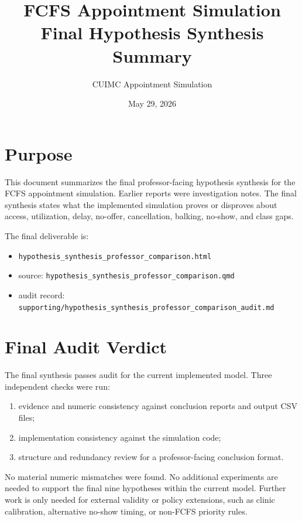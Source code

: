\documentclass[11pt]{article}
\title{FCFS Appointment Simulation\\Final Hypothesis Synthesis Summary}
\author{CUIMC Appointment Simulation}
\date{May 29, 2026}
\begin{document}
\maketitle

\section*{Purpose}

This document summarizes the final professor-facing hypothesis synthesis for
the FCFS appointment simulation. Earlier reports were investigation notes. The
final synthesis states what the implemented simulation proves or disproves about
access, utilization, delay, no-offer, cancellation, balking, no-show, and class
gaps.

The final deliverable is:

\begin{itemize}
  \item \texttt{hypothesis\_synthesis\_professor\_comparison.html}
  \item source: \texttt{hypothesis\_synthesis\_professor\_comparison.qmd}
  \item audit record: \texttt{supporting/hypothesis\_synthesis\_professor\_comparison\_audit.md}
\end{itemize}

\section*{Final Audit Verdict}

The final synthesis passes audit for the current implemented model. Three
independent checks were run:

\begin{enumerate}
  \item evidence and numeric consistency against conclusion reports and output
        CSV files;
  \item implementation consistency against the simulation code;
  \item structure and redundancy review for a professor-facing conclusion
        format.
\end{enumerate}

No material numeric mismatches were found. No additional experiments are needed
to support the final nine hypotheses within the current model. Further work is
only needed for external validity or policy extensions, such as clinic
calibration, alternative no-show timing, or non-FCFS priority rules.
\end{document}
